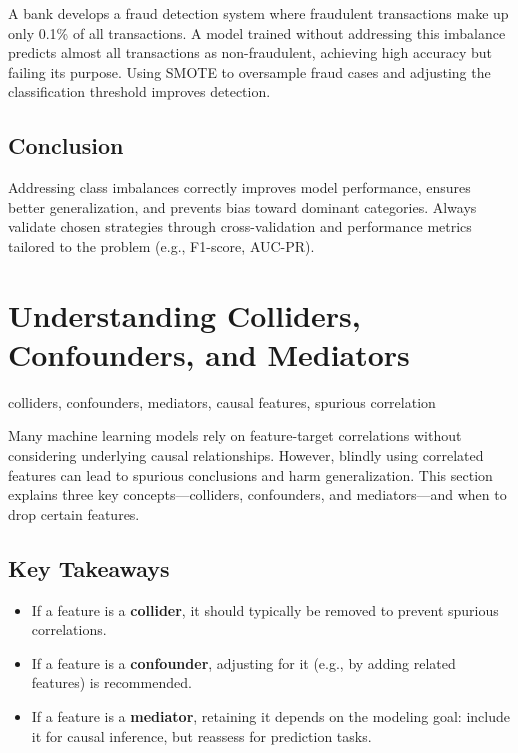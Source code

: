 \documentclass[12pt,openany, draft]{book}
\begin{document}
\begin{examplebox}
A bank develops a fraud detection system where fraudulent transactions make up only 0.1\% of all transactions. A model trained without addressing this imbalance predicts almost all transactions as non-fraudulent, achieving high accuracy but failing its purpose. Using SMOTE to oversample fraud cases and adjusting the classification threshold improves detection.
\end{examplebox}


\subsection{Conclusion}

Addressing class imbalances correctly improves model performance, ensures better generalization, and prevents bias toward dominant categories. Always validate chosen strategies through cross-validation and performance metrics tailored to the problem (e.g., F1-score, AUC-PR).



\section{Understanding Colliders, Confounders, and Mediators}

\begin{keywordsbox}
colliders, confounders, mediators, causal features, spurious correlation
\end{keywordsbox}

Many machine learning models rely on feature-target correlations without considering underlying causal relationships. However, blindly using correlated features can lead to spurious conclusions and harm generalization. This section explains three key concepts—colliders, confounders, and mediators—and when to drop certain features.

\subsection{Key Takeaways}
\begin{itemize}
    \item If a feature is a \textbf{collider}, it should typically be removed to prevent spurious correlations.
    \item If a feature is a \textbf{confounder}, adjusting for it (e.g., by adding related features) is recommended.
    \item If a feature is a \textbf{mediator}, retaining it depends on the modeling goal: include it for causal inference, but reassess for prediction tasks.
\end{itemize}
\end{document}
